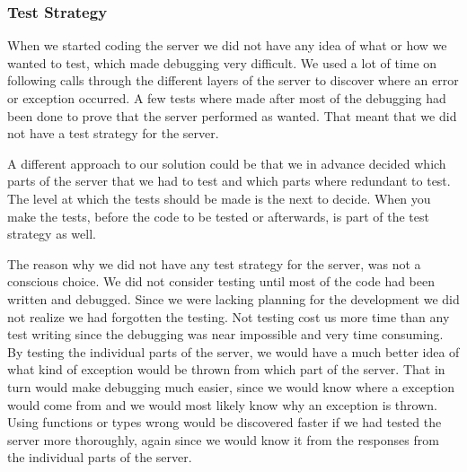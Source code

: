\subsubsection{Test Strategy}
When we started coding the server we did not have any idea of what or how we wanted to test, which made debugging very difficult. We used a lot of time on following calls through the different layers of the server to discover where an error or exception occurred. A few tests where made after most of the debugging had been done to prove that the server performed as wanted. That meant that we did not have a test strategy for the server.

A different approach to our solution could be that we in advance decided which parts of the server that we had to test and which parts where redundant to test. The level at which the tests should be made is the next to decide. When you make the tests, before the code to be tested or afterwards, is part of the test strategy as well.

The reason why we did not have any test strategy for the server, was not a conscious choice. We did not consider testing until most of the code had been written and debugged. Since we were lacking planning for the development we did not realize we had forgotten the testing. Not testing cost us more time than any test writing since the debugging was near impossible and very time consuming. By testing the individual parts of the server, we would have a much better idea of what kind of exception would be thrown from which part of the server. That in turn would make debugging much easier, since we would know where a exception would come from and we would most likely know why an exception is thrown. Using functions or types wrong would be discovered faster if we had tested the server more thoroughly, again since we would know it from the responses from the individual parts of the server. 